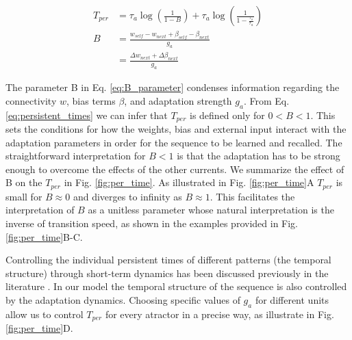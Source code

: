 \documentclass[10pt,a4paper]{article}
\begin{document}
\begin{align}
T_{per} &= \tau_a \log \left(\frac{1}{1 - B} \right) + \tau_a \log \left( \frac{                                                                                                                                                                                     1}{1 - \frac{\tau_s}{\tau_a}} \right) \label{eq:persistent_times}  \\ 
B &= \frac{w_{self} - w_{next} + \beta_{self} - \beta_{next}}{g_a} \label{eq:B_parameter} \\  
 &= \frac{\Delta w_{next} + \Delta \beta_{next}}{g_a} \nonumber  
\end{align}


The parameter B in Eq. \ref{eq:B_parameter} condenses information regarding the connectivity $w$, bias terms $\beta$, and adaptation strength $g_a$. From Eq. \ref{eq:persistent_times} we can infer that $T_{per}$ is defined only for $0 < B < 1$. This sets the conditions for how the weights, bias and external input interact with the adaptation parameters in order for the sequence to be learned and recalled. The straightforward interpretation for $B < 1$ is that the adaptation has to be strong enough to overcome the effects of the other currents. We summarize the effect of B on the $T_{per}$ in Fig. \ref{fig:per_time}. As illustrated in Fig. \ref{fig:per_time}A $T_{per}$ is small for $B \approx 0$ and diverges to infinity as $B \approx 1$. This facilitates the interpretation of $B$ as a unitless parameter whose natural interpretation is the inverse of transition speed, as shown in the examples provided in Fig. \ref{fig:per_time}B-C.

Controlling the individual persistent times of different patterns (the temporal structure) through short-term dynamics has been discussed previously in the literature \cite{veliz2015networks}. In our model the temporal structure of the sequence is also controlled  by the adaptation dynamics. Choosing specific values of $g_a$ for different units allow us to control $T_{per}$ for every atractor in a precise way, as illustrate in Fig. \ref{fig:per_time}D. 
\end{document}

